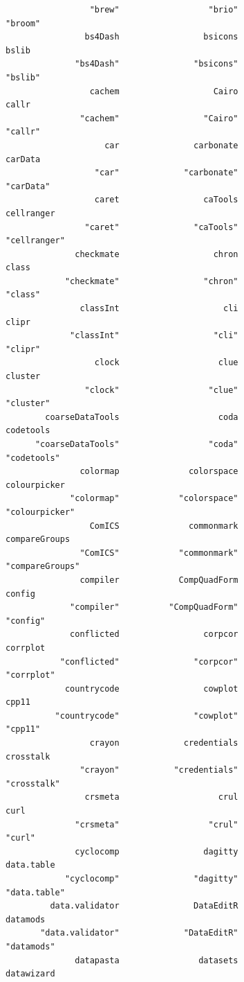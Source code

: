 \documentclass[
  letterpaper,
  DIV=11,
  numbers=noendperiod]{scrreprt}
\begin{document}
\begin{verbatim}
                 "brew"                  "brio"                 "broom" 
                bs4Dash                 bsicons                   bslib 
              "bs4Dash"               "bsicons"                 "bslib" 
                 cachem                   Cairo                   callr 
               "cachem"                 "Cairo"                 "callr" 
                    car               carbonate                 carData 
                  "car"             "carbonate"               "carData" 
                  caret                 caTools              cellranger 
                "caret"               "caTools"            "cellranger" 
              checkmate                   chron                   class 
            "checkmate"                 "chron"                 "class" 
               classInt                     cli                   clipr 
             "classInt"                   "cli"                 "clipr" 
                  clock                    clue                 cluster 
                "clock"                  "clue"               "cluster" 
        coarseDataTools                    coda               codetools 
      "coarseDataTools"                  "coda"             "codetools" 
               colormap              colorspace            colourpicker 
             "colormap"            "colorspace"          "colourpicker" 
                 ComICS              commonmark           compareGroups 
               "ComICS"            "commonmark"         "compareGroups" 
               compiler            CompQuadForm                  config 
             "compiler"          "CompQuadForm"                "config" 
             conflicted                 corpcor                corrplot 
           "conflicted"               "corpcor"              "corrplot" 
            countrycode                 cowplot                   cpp11 
          "countrycode"               "cowplot"                 "cpp11" 
                 crayon             credentials               crosstalk 
               "crayon"           "credentials"             "crosstalk" 
                crsmeta                    crul                    curl 
              "crsmeta"                  "crul"                  "curl" 
              cyclocomp                 dagitty              data.table 
            "cyclocomp"               "dagitty"            "data.table" 
         data.validator               DataEditR                datamods 
       "data.validator"             "DataEditR"              "datamods" 
              datapasta                datasets              datawizard 

\end{verbatim}
\end{document}
